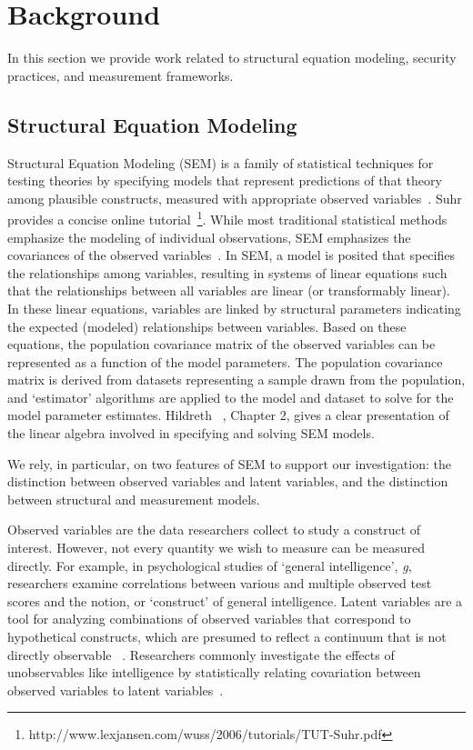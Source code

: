 \section{Background}
\label{sec:background}
In this section we provide work related to structural equation modeling, security practices, and measurement frameworks.

\subsection{Structural Equation Modeling}
Structural Equation Modeling (SEM) is a family of statistical techniques for testing theories by specifying models that represent predictions of that theory among plausible constructs, measured with appropriate observed variables~\cite{kline2015principles}. Suhr provides a concise online tutorial~\footnote{http://www.lexjansen.com/wuss/2006/tutorials/TUT-Suhr.pdf}. While most traditional statistical methods emphasize the modeling of individual observations, SEM emphasizes the covariances of the observed variables~\cite{hildreth2013residual}. In SEM, a model is posited that specifies the relationships among variables, resulting in systems of linear equations such that the relationships between all variables are linear (or transformably linear). In these linear equations, variables are linked by structural parameters indicating the expected (modeled) relationships between variables. Based on these equations, the population covariance matrix of the observed variables can be represented as a function of the model parameters. The population covariance matrix is derived from datasets representing a sample drawn from the population, and `estimator' algorithms are applied to the model and dataset to solve for the model parameter estimates. Hildreth ~\cite{hildreth2013residual}, Chapter 2, gives a clear presentation of the linear algebra involved in specifying and solving SEM models. 

We rely, in particular, on two features of SEM to support our investigation: the distinction between observed variables and latent variables, and the distinction between structural and measurement models.  

Observed variables are the data researchers collect to study a construct of interest. However, not every quantity we wish to measure can be measured directly. For example, in psychological studies of `general intelligence', \textit{g}, researchers examine correlations between various and multiple observed test scores and the notion, or `construct' of general intelligence. Latent variables are a tool for analyzing combinations of observed variables that correspond to hypothetical constructs, which are presumed to reflect a continuum that is not directly observable ~\cite{kline2015principles}. Researchers commonly investigate the effects of unobservables like intelligence by statistically relating covariation between observed variables to latent variables~\cite{borsboom2003theoretical}.  

